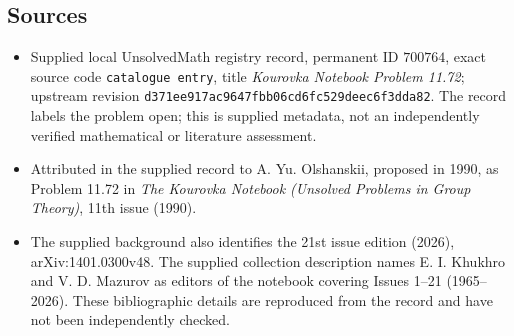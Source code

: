 \documentclass[11pt]{article}
\begin{document}
\subsection{Sources}
\begin{itemize}
\item Supplied local UnsolvedMath registry record, permanent ID \(700764\), exact source code \texttt{catalogue entry}, title \emph{Kourovka Notebook Problem 11.72}; upstream revision \texttt{d371ee917ac9647fbb06cd6fc529deec6f3dda82}. The record labels the problem open; this is supplied metadata, not an independently verified mathematical or literature assessment.
\item Attributed in the supplied record to A. Yu. Olshanskii, proposed in 1990, as Problem 11.72 in \emph{The Kourovka Notebook (Unsolved Problems in Group Theory)}, 11th issue (1990).
\item The supplied background also identifies the 21st issue edition (2026), arXiv:1401.0300v48. The supplied collection description names E. I. Khukhro and V. D. Mazurov as editors of the notebook covering Issues 1--21 (1965--2026). These bibliographic details are reproduced from the record and have not been independently checked.
\end{itemize}
\end{document}
